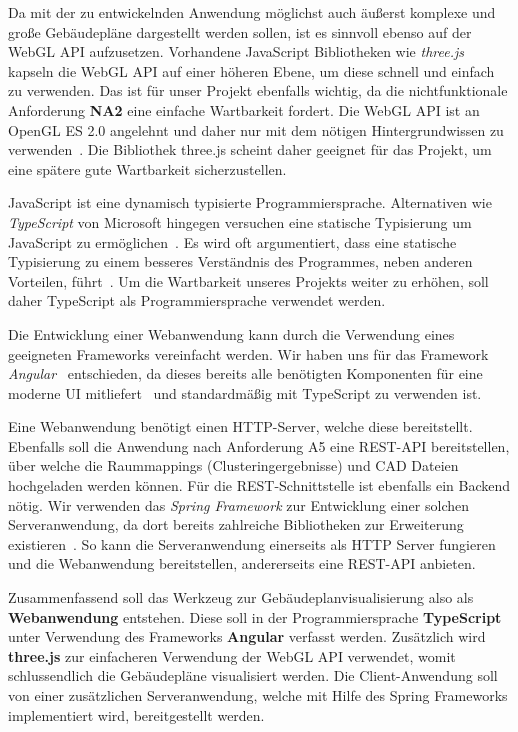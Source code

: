 Da mit der zu entwickelnden Anwendung möglichst auch äußerst komplexe und große Gebäudepläne dargestellt werden sollen, ist es sinnvoll ebenso auf der WebGL API aufzusetzen.
Vorhandene JavaScript Bibliotheken wie \textit{three.js}~\cite{ThreeJS} kapseln die WebGL API auf einer höheren Ebene, um diese schnell und einfach zu verwenden.
Das ist für unser Projekt ebenfalls wichtig, da die nichtfunktionale Anforderung \textbf{NA2} eine einfache Wartbarkeit fordert.
Die WebGL API ist an OpenGL ES 2.0 angelehnt und daher nur mit dem nötigen Hintergrundwissen zu verwenden~\cite{WebGL}.
Die Bibliothek three.js scheint daher geeignet für das Projekt, um eine spätere gute Wartbarkeit sicherzustellen.

JavaScript ist eine dynamisch typisierte Programmiersprache.
Alternativen wie \textit{TypeScript} von Microsoft hingegen versuchen eine statische Typisierung um JavaScript zu ermöglichen~\cite{ToTypeOrNotToType}.
Es wird oft argumentiert, dass eine statische Typisierung zu einem besseres Verständnis des Programmes, neben anderen Vorteilen, führt~\cite{ToTypeOrNotToType}.
Um die Wartbarkeit unseres Projekts weiter zu erhöhen, soll daher TypeScript als Programmiersprache verwendet werden.

Die Entwicklung einer Webanwendung kann durch die Verwendung eines geeigneten Frameworks vereinfacht werden.
Wir haben uns für das Framework \textit{Angular}~\cite{Angular} entschieden, da dieses bereits alle benötigten Komponenten für eine moderne UI mitliefert~\cite{AngularMaterial} und standardmäßig mit TypeScript zu verwenden ist.

Eine Webanwendung benötigt einen HTTP-Server, welche diese bereitstellt.
Ebenfalls soll die Anwendung nach Anforderung A5 eine REST-API bereitstellen, über welche die Raummappings (Clusteringergebnisse) und CAD Dateien hochgeladen werden können.
Für die REST-Schnittstelle ist ebenfalls ein \glqq{}Backend\grqq{} nötig.
Wir verwenden das \textit{Spring Framework} zur Entwicklung einer solchen Serveranwendung, da dort bereits zahlreiche Bibliotheken zur Erweiterung existieren~\cite{SpringFramework}.
So kann die Serveranwendung einerseits als HTTP Server fungieren und die Webanwendung bereitstellen, andererseits eine REST-API anbieten.

Zusammenfassend soll das Werkzeug zur Gebäudeplanvisualisierung also als \textbf{Webanwendung} entstehen.
Diese soll in der Programmiersprache \textbf{TypeScript} unter Verwendung des Frameworks \textbf{Angular} verfasst werden.
Zusätzlich wird \textbf{three.js} zur einfacheren Verwendung der WebGL API verwendet, womit schlussendlich die Gebäudepläne visualisiert werden.
Die Client-Anwendung soll von einer zusätzlichen Serveranwendung, welche mit Hilfe des Spring Frameworks implementiert wird, bereitgestellt werden.

